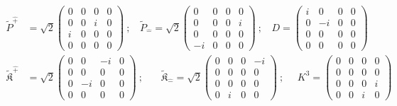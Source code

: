 \documentclass[]{article}
\numberwithin{equation}{section}
\begin{document}
{{\begin{align}
    \tilde{P}^{\hat{+}}&=\sqrt{2}\begin{pmatrix}
        0&0&0&0\\
        0&0&i&0\\
        i&0&0&0\\
        0&0&0&0
    \end{pmatrix}~;~~~~\tilde{P}_{\hat{-}}=\sqrt{2}\begin{pmatrix}
        0&0&0&0\\
        0&0&0&i\\
        0&0&0&0\\
        -i&0&0&0
    \end{pmatrix}~;~~~~D=\begin{pmatrix}
        i&0&0&0\\
        0&-i&0&0\\
        0&0&0&0\\
        0&0&0&0
    \end{pmatrix}\nonumber\\
    \tilde{\mathfrak{K}}^{\hat{+}}&=\sqrt{2}\begin{pmatrix}
        0&0&-i&0\\
        0&0&0&0\\
        0&-i&0&0\\
        0&0&0&0
    \end{pmatrix}~;~~~~~~~~\tilde{\mathfrak{K}}_{\hat{-}}=\sqrt{2}\begin{pmatrix}
        0&0&0&-i\\
        0&0&0&0\\
        0&0&0&0\\
        0&i&0&0
    \end{pmatrix}~;~~~~~~K^{3}=\begin{pmatrix}
        0&0&0&0\\
        0&0&0&0\\
        0&0&0&i\\
        0&0&i&0
    \end{pmatrix}
\end{align}
}}
\end{document}
